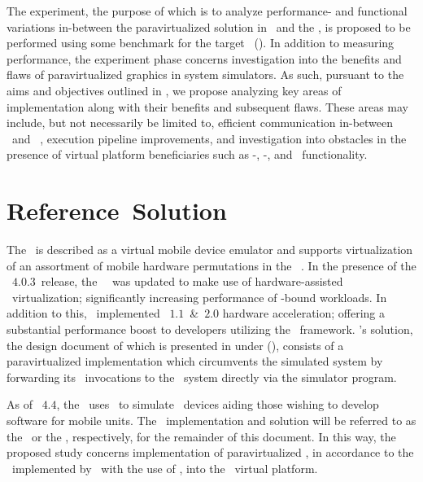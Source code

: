 The experiment, the purpose of which is to analyze performance- and functional variations in-between the paravirtualized solution in \termsimics\ and the \termrefsolu , is proposed to be performed using some benchmark for the target \termapi\ ().
In addition to measuring performance, the experiment phase concerns investigation into the benefits and flaws of paravirtualized graphics in system simulators.
As such, pursuant to the aims and objectives outlined in , we propose analyzing key areas of implementation along with their benefits and subsequent flaws.
These areas may include, but not necessarily be limited to, efficient communication in-between \termtarget\ and \termhost\ , execution pipeline improvements, and investigation into obstacles in the presence of virtual platform beneficiaries such as \termdetexe -, \termcheckpointing -, and \termrevexe\ functionality.

\section{Reference~Solution}
\label{sec:researchmethodology_referencesolution}
The \termandroidemu\ is described as a virtual mobile device emulator and supports virtualization of an assortment of mobile hardware permutations in the \termandroid ~\termsdk {}.
In the presence of the \termandroid ~$4.0.3$\ release, the \termandroid ~\termsdk\ was updated to make use of hardware-assisted \termxeightysix\ virtualization; significantly increasing performance of \termcpu -bound workloads.
In addition to this, \termgoogle\ implemented \termopengles ~$1.1$~\&~$2.0$ hardware acceleration; offering a substantial performance boost to developers utilizing the \termopengles\ framework.
\termgoogle 's solution, the design document of which is presented in under  (), consists of a paravirtualized implementation which circumvents the simulated system by forwarding its \termopengles\ invocations to the \termhost\ system directly via the simulator program.

As of \termandroid ~$4.4$, the \termandroidemu\ uses \termqemu\ to simulate \termarm\ devices aiding those wishing to develop software for mobile units.
The \termandroidemu\ implementation and solution will be referred to as the \termrefimpl\ or the \termrefsolu , respectively, for the remainder of this document.
In this way, the proposed study concerns implementation of paravirtualized \termopengles , in accordance to the \termrefsolu\ implemented by \termgoogle\ with the use of \termqemu , into the \termsimics\ virtual platform.

